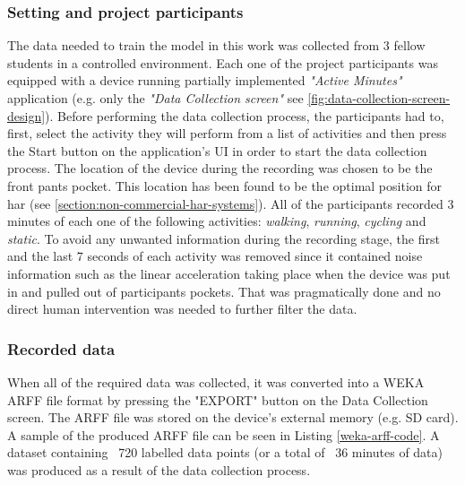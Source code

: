     \subsubsection*{Setting and project participants}
    The data needed to train the model in this work was collected from 3 fellow students in a controlled environment. Each one of the project participants was equipped with a device running partially implemented \textit{"Active Minutes"} application (e.g. only the \textit{"Data Collection screen"} see \ref{fig:data-collection-screen-design}). Before performing the data collection process, the participants had to, first, select the activity they will perform from a list of activities and then press the Start button on the application's UI in order to start the data collection process. The location of the device during the recording was chosen to be the front pants pocket. This location has been found to be the optimal position for \gls{har} (see \ref{section:non-commercial-har-systems}). All of the participants recorded 3 minutes of each one of the following activities: \textit{walking}, \textit{running}, \textit{cycling} and \textit{static}. To avoid any unwanted information during the recording stage, the first and the last 7 seconds of each activity was removed since it contained noise information such as the linear acceleration taking place when the device was put in and pulled out of participants pockets. That was pragmatically done and no direct human intervention was needed to further filter the data.
    
    \subsubsection*{Recorded data}
    \label{subsubsection:recorded_data}
    When all of the required data was collected, it was converted into a WEKA ARFF file format by pressing the "EXPORT" button on the Data Collection screen. The ARFF file was stored on the device's external memory (e.g. SD card). A sample of the produced ARFF file can be seen in Listing \ref{weka-arff-code}. A dataset containing ~720 labelled data points (or a total of ~36 minutes of data) was produced as a result of the data collection process. 
    
   
    
